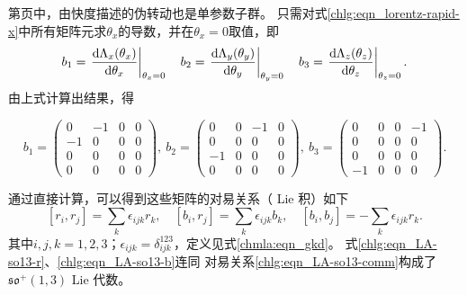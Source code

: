 第\pageref{chlg:sec_rapid}页中，由快度描述的伪转动也是单参数子群。
只需对式\eqref{chlg:eqn_lorentz-rapid-x}中所有矩阵元求$\theta_x$的导数，并在$\theta_x=0$取值，即
\begin{equation}
    b_1=\left.\frac{{\rm d}\Lambda_x(\theta_x)}{{\rm d}\theta_x}\right|_{\theta_x=0} \quad
    b_2=\left.\frac{{\rm d}\Lambda_y(\theta_y)}{{\rm d}\theta_y}\right|_{\theta_y=0} \quad
    b_3=\left.\frac{{\rm d}\Lambda_z(\theta_z)}{{\rm d}\theta_z}\right|_{\theta_z=0} .
\end{equation}
由上式计算出结果，得
\begin{small}

\begin{equation}\label{chlg:eqn_LA-so13-b}
    b_1=  \begin{pmatrix}
        0  & -1 & 0 & 0 \\
        -1 & 0  & 0 & 0 \\
        0 & 0 & 0 & 0 \\
        0 & 0 & 0 & 0 
    \end{pmatrix},\ 
    b_2 =  \begin{pmatrix}
        0  & 0 & -1 & 0 \\
        0 & 0  & 0 & 0 \\
        -1 & 0 & 0 & 0 \\
        0 & 0 & 0 & 0 
    \end{pmatrix},\ 
    b_3 =  \begin{pmatrix}
        0  & 0 & 0 & -1 \\
        0 & 0  & 0 & 0 \\
        0 & 0 & 0 & 0 \\
        -1 & 0 & 0 & 0 
    \end{pmatrix} .
\end{equation} 
\end{small}

通过直接计算，可以得到这些矩阵的对易关系（ Lie 积）如下
\begin{equation}\label{chlg:eqn_LA-so13-comm}
    [r_i, r_j] = \sum_k \epsilon_{ijk} r_k,\quad
    [b_i, r_j] = \sum_k \epsilon_{ijk} b_k,\quad
    [b_i, b_j] = -\sum_k \epsilon_{ijk} r_k.
\end{equation}
其中$i,j,k=1,2,3$；$\epsilon_{ijk}=\delta^{123}_{ijk}$，定义见式\eqref{chmla:eqn_gkd}。
式\eqref{chlg:eqn_LA-so13-r}、\eqref{chlg:eqn_LA-so13-b}连同
对易关系\eqref{chlg:eqn_LA-so13-comm}构成了$\mathfrak{so}^{+}(1,3)$ Lie 代数。




